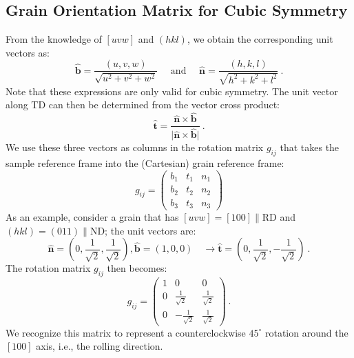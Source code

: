 \subsection{Grain Orientation Matrix for Cubic Symmetry}\label{\chabbr:ssec:grainORmatcubic}
From the knowledge of $[uvw]$ and $(hkl)$, we obtain the corresponding unit vectors as:
\begin{equation*}
	\hat{\mathbf{b}} = \frac{(u,v,w)}{\sqrt{u^2+v^2+w^2}}\quad\text{ and }\quad\hat{\mathbf{n}}=\frac{(h,k,l)}{\sqrt{h^2+k^2+l^2}}\ .
\end{equation*}
Note that these expressions are only valid for cubic symmetry.  The unit vector along TD can then be determined from the vector cross product:
\begin{equation*}
	\hat{\mathbf{t}} = \frac{\hat{\mathbf{n}}\times\hat{\mathbf{b}}}{\vert \hat{\mathbf{n}}\times\hat{\mathbf{b}}\vert}\ .
\end{equation*}
We use these three vectors as columns in the rotation matrix $g_{ij}$ that takes the sample reference frame into the (Cartesian) grain reference frame:
\begin{equation}
g_{ij}= \begin{pmatrix}
b_1 & t_1 & n_1\\
b_2 & t_2 & n_2\\
b_3 & t_3 & n_3
\end{pmatrix}
\end{equation}
As an example, consider a grain that has $[uvw]=[100]\parallel$RD and $(hkl)=(011)\parallel$ND; the unit vectors are:
\[
	\hat{\mathbf{n}}=\left(0,\frac{1}{\sqrt{2}},\frac{1}{\sqrt{2}}\right), \hat{\mathbf{b}}=(1,0,0)\quad\rightarrow \hat{\mathbf{t}}=\left(0,\frac{1}{\sqrt{2}},-\frac{1}{\sqrt{2}}\right)\ .
\]
The rotation matrix $g_{ij}$ then becomes:
\[
g_{ij}=\begin{pmatrix}
1&0&0\\
0&\frac{1}{\sqrt{2}}&\frac{1}{\sqrt{2}}\\
0&-\frac{1}{\sqrt{2}}&\frac{1}{\sqrt{2}}
\end{pmatrix}\ .
\]
We recognize this matrix to represent a counterclockwise $45^{\circ}$ rotation around the $[100]$ axis, i.e., the rolling direction.  

